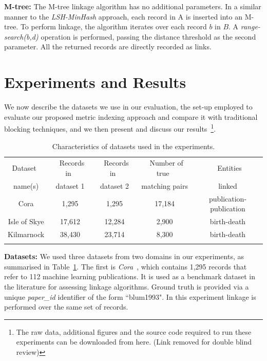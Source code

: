 \documentclass{llncs}
\begin{document}
\textbf{M-tree:} The M-tree linkage algorithm has no additional
parameters. In a similar manner to the \emph{LSH-MinHash} approach, each
record in A is inserted into an M-tree. To perform linkage, the
algorithm iterates over each record $b$ in $B$. A \emph{range-search(b,d)}
operation is performed, passing the distance threshold as the second
parameter. All the returned records are directly recorded as links.


\section{Experiments and Results}
\label{sec-exp}

We now describe the datasets we use in our evaluation, the set-up
employed to evaluate our proposed metric indexing approach and compare
it with traditional blocking techniques, and we then present and discuss
our results~\footnote{The raw data, additional figures and the source
code required to run these experiments can be downloaded from here.
(Link removed for double blind review)}.


\begin{table}[t]
\caption{Characteristics of datasets used in the experiments.}
 \label{table-datasets}
  \centering
  \begin{scriptsize}
  \begin{tabular}{ccccc}
  \hline\noalign{\smallskip}
  Dataset~ & ~Records in~& ~Records in~ & ~Number of true~& ~Entities\\
  name(s)  & dataset 1  & dataset 2  & matching pairs & linked \\
  \noalign{\smallskip} \hline \noalign{\smallskip}
  Cora & 1,295 & 1,295 & 17,184 & publication-publication\\
  Isle of Skye & 17,612 & 12,284& 2,900 & birth-death\\
  Kilmarnock & 38,430 & 23,714 & 8,300 & birth-death\\
  \noalign{\smallskip} \hline
  \end{tabular}
  \end{scriptsize}
\end{table}

\smallskip
\textbf{Datasets:}
\label{sec-data}
We used three datasets from two domains in our experiments, as
summarised in Table~\ref{table-datasets}. The first is
\emph{Cora}~\cite{Cora2017}, which contains 1,295 records that refer to
112 machine learning publications. It is used as a benchmark dataset in
the literature for assessing linkage algorithms. Ground truth is
provided via a unique \emph{paper\_id} identifier of the form
``blum1993". In this experiment linkage is performed over the same set
of records.
\end{document}
